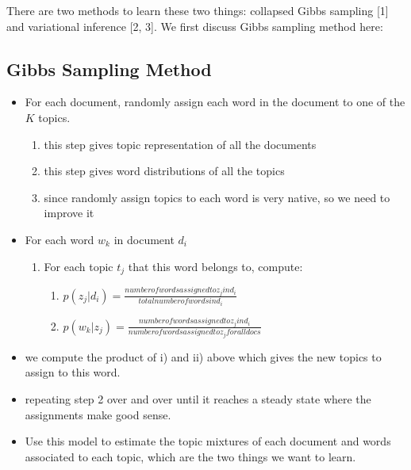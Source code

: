 \documentclass{article} %
\begin{document}
There are two methods to learn these two things: collapsed Gibbs sampling [1] and variational inference [2, 3]. We first discuss Gibbs sampling method here:


\subsection{Gibbs Sampling Method}
\begin{itemize}
\item For each document, randomly assign each word in the document to one of the $K$ topics.
\begin{enumerate}
\item this step gives topic representation of all the documents
\item this step gives word distributions of all the topics
\item since randomly assign topics to each word is very native, so we need to improve it
\end{enumerate}
\item For each word $w_k$ in document $d_i$
\begin{enumerate}
\item For each topic $t_j$ that this word belongs to, compute:
\begin{enumerate}
\item $p(z_j | d_i)  = \frac{number of words assigned to z_j in d_i}{total number of words in d_i}$
\item $p( w_k |  z_j) = \frac{number of words assigned to z_j in d_i}{number of words assigned to z_j for all docs}$
\end{enumerate}
\end{enumerate}
\item we compute the product of i) and ii) above which gives the new topics to assign to this word.
\item repeating step 2 over and over until it reaches a steady state where the assignments make good sense.
\item Use this model to estimate the topic mixtures of each document and words associated to each topic, which are the two things we want to learn.
\end{itemize}
\end{document}
